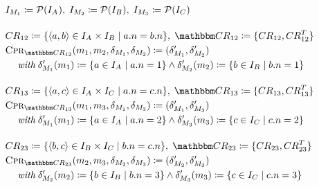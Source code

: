 \begin{align*}
    & 
    \metamodelinstanceset{M}{1} \equalsperdefinition \mathcal{P}(\instances{\class{A}{}}), \;%
    \metamodelinstanceset{M}{2} \equalsperdefinition \mathcal{P}(\instances{\class{B}{}}), \;%
    \metamodelinstanceset{M}{3} \equalsperdefinition \mathcal{P}(\instances{\class{C}{}}) \\[1em]
    &
    \consistencyrelation{CR}{12} \equalsperdefinition \setted{\tupled{a,b} \in \instances{\class{A}{}} \times \instances{\class{B}{}} \mid a.n = b.n}, \;
    \consistencyrelationset{CR}_{12} \equalsperdefinition \setted{\consistencyrelation{CR}{12}, \consistencyrelation{CR}{12}^T} \\
    &
    \consistencypreservationrule{\consistencyrelationset{CR}_{12}}(\model{m}{1}, \model{m}{2}, \change{\metamodel{M}{1}}, \change{\metamodel{M}{2}}) \equalsperdefinition (\change{\metamodel{M}{1}}', \change{\metamodel{M}{2}}') \\
    & \formulaskip
        \withmath \change{\metamodel{M}{1}}'(\model{m}{1}) \equalsperdefinition \setted{a \in \instances{\class{A}{}} \mid a.n = 1} \land \change{\metamodel{M}{2}}'(\model{m}{2}) \equalsperdefinition \setted{b \in \instances{\class{B}{}} \mid b.n = 1} \\[1em]
    &
    \consistencyrelation{CR}{13} \equalsperdefinition \setted{\tupled{a,c} \in \instances{\class{A}{}} \times \instances{\class{C}{}} \mid a.n = c.n}, \;
    \consistencyrelationset{CR}_{13} \equalsperdefinition \setted{\consistencyrelation{CR}{13}, \consistencyrelation{CR}{13}^T} \\
    &
    \consistencypreservationrule{\consistencyrelationset{CR}_{13}}(\model{m}{1}, \model{m}{3}, \change{\metamodel{M}{1}}, \change{\metamodel{M}{3}}) \equalsperdefinition (\change{\metamodel{M}{1}}', \change{\metamodel{M}{3}}') \\
    & \formulaskip
        \withmath \change{\metamodel{M}{1}}'(\model{m}{1}) \equalsperdefinition \setted{a \in \instances{\class{A}{}} \mid a.n = 2} \land \change{\metamodel{M}{3}}'(\model{m}{3}) \equalsperdefinition \setted{c \in \instances{\class{C}{}} \mid c.n = 2} \\[1em]
    &
    \consistencyrelation{CR}{23} \equalsperdefinition \setted{\tupled{b,c} \in \instances{\class{B}{}} \times \instances{\class{C}{}} \mid b.n = c.n}, \;
    \consistencyrelationset{CR}_{23} \equalsperdefinition \setted{\consistencyrelation{CR}{23}, \consistencyrelation{CR}{23}^T} \\
    &
    \consistencypreservationrule{\consistencyrelationset{CR}_{23}}(\model{m}{2}, \model{m}{3}, \change{\metamodel{M}{2}}, \change{\metamodel{M}{3}}) \equalsperdefinition (\change{\metamodel{M}{2}}', \change{\metamodel{M}{3}}') \\
    & \formulaskip
        \withmath \change{\metamodel{M}{2}}'(\model{m}{2}) \equalsperdefinition \setted{b \in \instances{\class{B}{}} \mid b.n = 3} \land \change{\metamodel{M}{3}}'(\model{m}{3}) \equalsperdefinition \setted{c \in \instances{\class{C}{}} \mid c.n = 3}
\end{align*}


